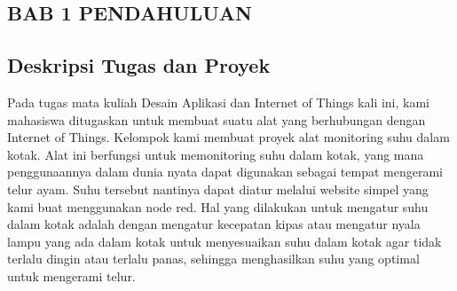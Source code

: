 
\begin{center}
    \section*{BAB 1 PENDAHULUAN}
\end{center}

\setcounter{section}{1} %
\subsection{Deskripsi Tugas dan Proyek}
Pada tugas mata kuliah Desain Aplikasi dan Internet of Things kali ini, kami mahasiswa ditugaskan untuk membuat suatu alat yang berhubungan dengan Internet of Things. Kelompok kami membuat proyek alat monitoring suhu dalam kotak. Alat ini berfungsi untuk memonitoring suhu dalam kotak, yang mana penggunaannya dalam dunia nyata dapat digunakan sebagai tempat mengerami telur ayam. Suhu tersebut nantinya dapat diatur melalui website simpel yang kami buat menggunakan node red. Hal yang dilakukan untuk mengatur suhu dalam kotak adalah dengan mengatur kecepatan kipas atau mengatur nyala lampu yang ada dalam kotak untuk menyesuaikan suhu dalam kotak agar tidak terlalu dingin atau terlalu panas, sehingga menghasilkan suhu yang optimal untuk mengerami telur.

    